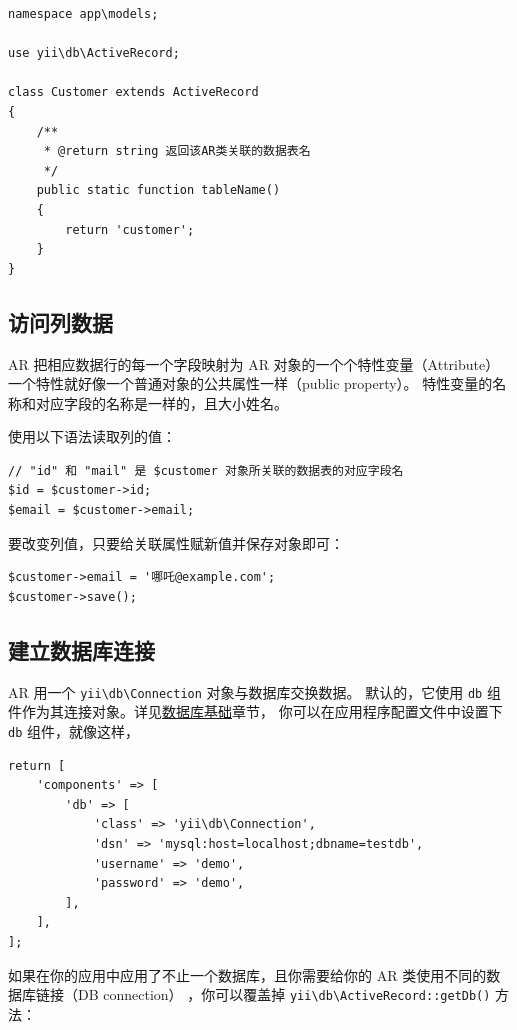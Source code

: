 \lstset{language=php}\begin{lstlisting}
namespace app\models;

use yii\db\ActiveRecord;

class Customer extends ActiveRecord
{
    /**
     * @return string 返回该AR类关联的数据表名
     */
    public static function tableName()
    {
        return 'customer';
    }
}
\end{lstlisting}
\subsection{访问列数据}
AR 把相应数据行的每一个字段映射为 AR 对象的一个个特性变量（Attribute）
一个特性就好像一个普通对象的公共属性一样（public property）。
特性变量的名称和对应字段的名称是一样的，且大小姓名。

使用以下语法读取列的值：

\lstset{language=php}\begin{lstlisting}
// "id" 和 "mail" 是 $customer 对象所关联的数据表的对应字段名
$id = $customer->id;
$email = $customer->email;
\end{lstlisting}
要改变列值，只要给关联属性赋新值并保存对象即可：

\lstset{language=php}\begin{lstlisting}
$customer->email = '哪吒@example.com';
$customer->save();
\end{lstlisting}
\subsection{建立数据库连接}
AR 用一个 \texttt{yii{\allowbreak{}\textbackslash}db{\allowbreak{}\textbackslash}Connection} 对象与数据库交换数据。
默认的，它使用 \lstinline|db| 组件作为其连接对象。详见\hyperref[database-basics.md]{数据库基础}章节，
你可以在应用程序配置文件中设置下 \lstinline|db| 组件，就像这样，

\lstset{language=php}\begin{lstlisting}
return [
    'components' => [
        'db' => [
            'class' => 'yii\db\Connection',
            'dsn' => 'mysql:host=localhost;dbname=testdb',
            'username' => 'demo',
            'password' => 'demo',
        ],
    ],
];
\end{lstlisting}
如果在你的应用中应用了不止一个数据库，且你需要给你的 AR 类使用不同的数据库链接（DB connection）
，你可以覆盖掉 \texttt{yii{\allowbreak{}\textbackslash}db{\allowbreak{}\textbackslash}ActiveRecord\allowbreak{}::\allowbreak{}getDb()} 方法：

